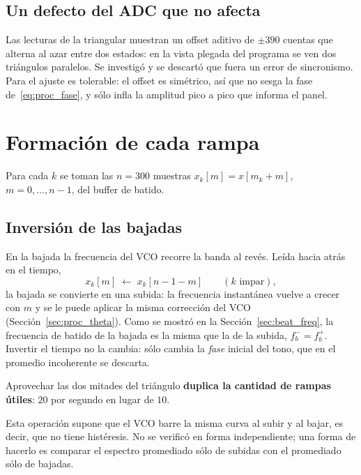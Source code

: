 \subsection{Un defecto del ADC que no afecta}

Las lecturas de la triangular muestran un offset aditivo de
$\pm 390$ cuentas que alterna al azar entre dos estados: en la vista
plegada del programa se ven dos triángulos paralelos. Se investigó y se
descartó que fuera un error de sincronismo. Para el ajuste es tolerable: el
offset es simétrico, así que no sesga la fase de~\eqref{eq:proc_fase}, y
sólo infla la amplitud pico a pico que informa el panel.

\section{Formación de cada rampa}
\label{sec:proc_rampa}

Para cada $k$ se toman las $n = 300$ muestras
$x_k[m] = x[m_k + m]$, $m = 0, \dots, n-1$, del buffer de batido.

\subsection{Inversión de las bajadas}

En la bajada la frecuencia del VCO recorre la banda al revés. Leída hacia
atrás en el tiempo,
\begin{equation}
  x_k[m] \;\leftarrow\; x_k[n-1-m] \qquad (k \text{ impar}),
\end{equation}
la bajada se convierte en una subida: la frecuencia instantánea vuelve a
crecer con $m$ y se le puede aplicar la misma corrección del VCO
(Sección~\ref{sec:proc_theta}). Como se mostró en la
Sección~\ref{sec:beat_freq}, la frecuencia de batido de la bajada es la
misma que la de la subida, $f_b^- = f_b^+$. Invertir el tiempo no la
cambia: sólo cambia la \emph{fase} inicial del tono, que en el promedio
incoherente se descarta.

Aprovechar las dos mitades del triángulo \textbf{duplica la cantidad de
rampas útiles}: $20$ por segundo en lugar de $10$.

Esta operación supone que el VCO barre la misma curva al subir y al bajar,
es decir, que no tiene histéresis. No se verificó en forma independiente;
una forma de hacerlo es comparar el espectro promediado sólo de subidas con
el promediado sólo de bajadas.

